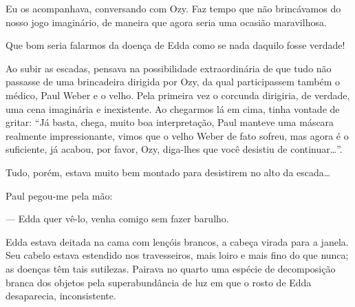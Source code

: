 
Eu os acompanhava, conversando com Ozy. Faz tempo que não brincávamos do nosso
jogo imaginário, de maneira que agora seria uma ocasião maravilhosa.

Que bom seria falarmos da doença de Edda como se nada daquilo fosse verdade!

Ao subir as escadas, pensava na possibilidade extraordinária de que tudo não
passasse de uma brincadeira dirigida por Ozy, da qual participassem também o
médico, Paul Weber e o velho. Pela primeira vez o corcunda dirigiria, de
verdade, uma cena imaginária e inexistente. Ao chegarmos lá em cima, tinha
vontade de gritar: ``Já basta, chega, muito boa interpretação, Paul manteve
uma máscara realmente impressionante, vimos que o velho Weber de fato sofreu,
mas agora é o suficiente, já acabou, por favor, Ozy, diga-lhes que você
desistiu de continuar\ldots{}''.

Tudo, porém, estava muito bem montado para desistirem no alto da escada\ldots
{}


Paul pegou-me pela mão:

--- Edda quer vê-lo, venha comigo sem fazer barulho.

Edda estava deitada na cama com lençóis brancos, a cabeça virada para a
janela. Seu cabelo estava estendido nos travesseiros, mais loiro e mais fino
do que nunca; as doenças têm tais sutilezas. Pairava no quarto uma espécie de
decomposição branca dos objetos pela superabundância de luz em que o rosto de
Edda desaparecia, inconsistente.

